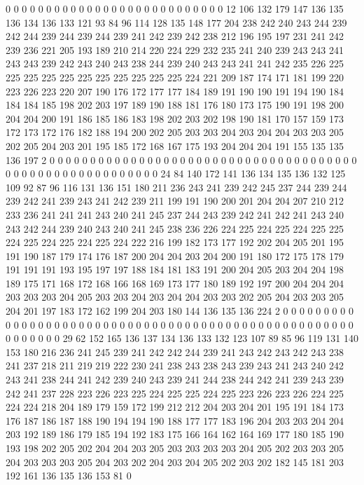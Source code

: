 0 0 0 0 0 0 0 0 0 0 0 0 0 0 0 0 0 0 0 0
0 0 0 0 0 0 0 12 106 132 179 147 136 135 136 134 136 133 121 93
84 96 114 128 135 148 177 204 238 242 240 243 244 239 242 244 239 244 239 244
239 241 242 239 242 238 212 196 195 197 231 241 242 239 236 221 205 193 189 210
214 220 224 229 232 235 241 240 239 243 243 241 243 243 239 242 243 240 243 238
244 239 240 243 243 241 241 242 235 226 225 225 225 225 225 225 225 225 225 225
225 224 221 209 187 174 171 181 199 220 223 226 223 220 207 190 176 172 177 177
184 189 191 190 190 191 194 190 184 184 184 185 198 202 203 197 189 190 188 181
176 180 173 175 190 191 198 200 204 204 200 191 186 185 186 183 198 202 203 202
198 190 181 170 157 159 173 172 173 172 176 182 188 194 200 202 205 203 203 204
203 204 204 203 203 205 202 205 204 203 201 195 185 172 168 167 175 193 204 204
204 191 155 135 135 136 197 2 0 0 0 0 0 0 0 0 0 0 0 0
0 0 0 0 0 0 0 0 0 0 0 0 0 0 0 0 0 0 0 0
0 0 0 0 0 0 0 0 0 0 0 0 0 0 0 0 0 0 0 0
0 0 0 0 0 24 84 140 172 141 136 134 135 136 132 125 109 92 87 96
116 131 136 151 180 211 236 243 241 239 242 245 237 244 239 244 239 242 241 239
243 241 242 239 211 199 191 190 200 201 204 204 207 210 212 233 236 241 241 241
243 240 241 245 237 244 243 239 242 241 242 241 243 240 243 242 244 239 240 243
240 241 245 238 236 226 224 225 224 225 224 225 225 224 225 224 225 224 225 224
222 216 199 182 173 177 192 202 204 205 201 195 191 190 187 179 174 176 187 200
204 204 203 204 200 191 180 172 175 178 179 191 191 191 193 195 197 197 188 184
181 183 191 200 204 205 203 204 204 198 189 175 171 168 172 168 166 168 169 173
177 180 189 192 197 200 204 204 204 203 203 203 204 205 203 203 204 203 204 204
203 203 202 205 204 203 203 205 204 201 197 183 172 162 199 204 203 180 144 136
135 136 224 2 0 0 0 0 0 0 0 0 0 0 0 0 0 0 0 0
0 0 0 0 0 0 0 0 0 0 0 0 0 0 0 0 0 0 0 0
0 0 0 0 0 0 0 0 0 0 0 0 0 0 0 0 0 0 0 0
0 0 0 29 62 152 165 136 137 134 136 133 132 123 107 89 85 96 119 131
140 153 180 216 236 241 245 239 241 242 242 244 239 241 243 242 243 242 243 238
241 237 218 211 219 219 222 230 241 238 243 238 243 239 243 241 243 240 242 243
241 238 244 241 242 239 240 243 239 241 244 238 244 242 241 239 243 239 242 241
237 228 223 226 223 225 224 225 225 224 225 223 226 223 226 224 225 224 224 218
204 189 179 159 172 199 212 212 204 203 204 201 195 191 184 173 176 187 186 187
188 190 194 194 190 188 177 177 183 196 204 203 203 204 204 203 192 189 186 179
185 194 192 183 175 166 164 162 164 169 177 180 185 190 193 198 202 205 202 204
204 203 205 203 203 203 203 204 205 202 203 203 205 204 203 203 203 205 204 203
202 204 203 204 205 202 203 202 182 145 181 203 192 161 136 135 136 153 81 0
